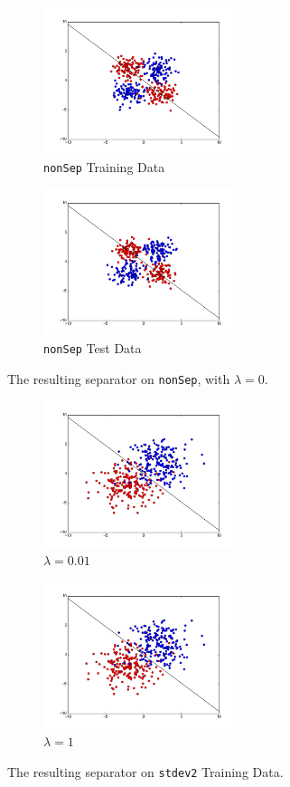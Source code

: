 \documentclass{sigchi}
\begin{document}
\begin{figure}
\centering

\begin{subfigure}[b]{2.25in}
	\includegraphics[width = 2.25in]{plots/nonSep2_train_plot.png}
	\caption{\texttt{nonSep} Training Data}
\end{subfigure}

\begin{subfigure}[b]{2.25in}
	\includegraphics[width = 2.25in]{plots/nonSep2_test_plot.png}
	\caption{\texttt{nonSep} Test Data}
\end{subfigure}
\caption{The resulting separator on \texttt{nonSep}, with $\lambda = 0$.}
\end{figure}


\begin{figure}
\centering

\begin{subfigure}[b]{2.25in}
	\includegraphics[width = 2.25in]{plots/stdev2_test_plot_lambda_01.png}
	\caption{$\lambda = 0.01$}
\end{subfigure}

\begin{subfigure}[b]{2.25in}
	\includegraphics[width = 2.25in]{plots/stdev2_test_plot_lambda_1.png}
	\caption{$\lambda = 1$}
\end{subfigure}
\caption{The resulting separator on \texttt{stdev2} Training Data.}

\end{figure}
\end{document}
